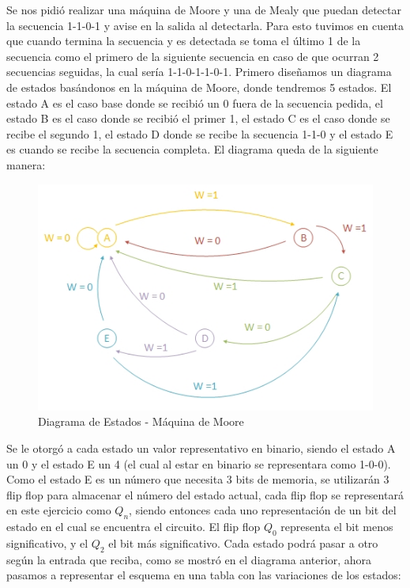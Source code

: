 \documentclass[10pt,a4paper]{article}
\begin{document}
Se nos pidi\'o realizar una m\'aquina de Moore y una de Mealy que puedan detectar la secuencia 1-1-0-1 y avise en la salida al detectarla. Para esto tuvimos en cuenta que cuando termina la secuencia y es detectada se toma el \'ultimo 1 de la secuencia como el primero de la siguiente secuencia en caso de que ocurran 2 secuencias seguidas, la cual ser\'ia 1-1-0-1-1-0-1. Primero diseñamos un diagrama de estados basándonos en la m\'aquina de Moore, donde tendremos 5 estados. El estado A es el caso base donde se recibió un 0 fuera de la secuencia pedida, el estado B es el caso donde se recibió el primer 1, el estado C es el caso donde se recibe el segundo 1, el estado D donde se recibe la secuencia 1-1-0 y el estado E es cuando se recibe la secuencia completa. 
El diagrama queda de la siguiente manera:

\begin{figure}[hbtp]
	\centering
		\includegraphics[scale=1]{diagestmoore.jpg}
	\caption{Diagrama de Estados - Máquina de Moore}
\end{figure}

Se le otorgó a cada estado un valor representativo en binario, siendo el estado A un 0 y el estado E un 4 (el cual al estar en binario se representara como 1-0-0). Como el estado E es un número que necesita 3 bits de memoria, se utilizar\'an 3 flip flop para almacenar el número del estado actual, cada flip flop se representar\'a en este ejercicio como $Q_n$, siendo entonces cada uno representación de un bit del estado en el cual se encuentra el circuito. El flip flop $Q_0$ representa el bit menos significativo, y el $Q_2$ el bit más significativo. Cada estado podr\'a pasar a otro seg\'un la entrada que reciba, como se mostr\'o en el diagrama anterior, ahora pasamos a representar el esquema en una tabla con las variaciones de los estados:
\end{document}
